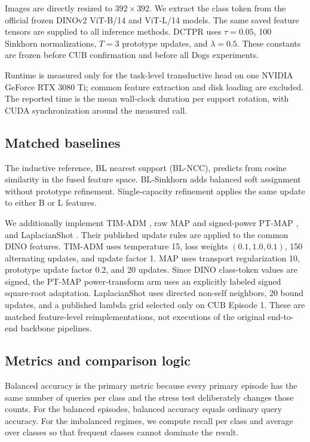 \documentclass[10pt,twocolumn]{article}
\newcommand{\method}{\textsc{DCTPR}\xspace}
\begin{document}
Images are directly resized to $392\times392$. We extract the class token from
the official frozen DINOv2 ViT-B/14 and ViT-L/14 models. The same saved feature
tensors are supplied to all inference methods. \method uses $\tau=0.05$, 100
Sinkhorn normalizations, $T=3$ prototype updates, and $\lambda=0.5$. These
constants are frozen before CUB confirmation and before all Dogs experiments.

Runtime is measured only for the task-level transductive head on one NVIDIA
GeForce RTX 3080 Ti; common feature extraction and disk loading are excluded.
The reported time is the mean wall-clock duration per support rotation, with
CUDA synchronization around the measured call.

\subsection{Matched baselines}

The inductive reference, BL nearest support (BL-NCC), predicts from cosine
similarity in the fused feature space. BL-Sinkhorn adds balanced soft assignment
without prototype refinement. Single-capacity refinement applies the same update
to either B or L features.

We additionally implement TIM-ADM \cite{tim}, raw MAP and signed-power PT-MAP
\cite{ptmap}, and LaplacianShot \cite{laplacianshot}. Their published update
rules are applied to the common DINO features. TIM-ADM uses temperature 15,
loss weights $(0.1,1.0,0.1)$, 150 alternating updates, and update factor 1.
MAP uses transport regularization 10, prototype update factor 0.2, and 20
updates. Since DINO class-token values are signed, the PT-MAP power-transform
arm uses an explicitly labeled signed square-root adaptation. LaplacianShot
uses directed non-self neighbors, 20 bound updates, and a published lambda grid
selected only on CUB Episode 1. These are matched feature-level
reimplementations, not executions of the original end-to-end backbone pipelines.

\subsection{Metrics and comparison logic}

Balanced accuracy is the primary metric because every primary episode has the
same number of queries per class and the stress test deliberately changes those
counts. For the balanced episodes, balanced accuracy equals ordinary query
accuracy. For the imbalanced regimes, we compute recall per class and average
over classes so that frequent classes cannot dominate the result.
\end{document}
